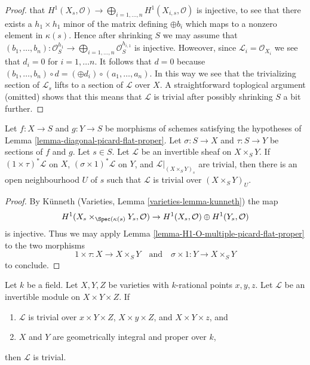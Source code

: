 \begin{proof}
that $H^1(X_s, \mathcal{O}) \to
\bigoplus_{i = 1, \ldots, n} H^1(X_{i, s}, \mathcal{O})$
is injective, to see that there exists a $h_1 \times h_1$ minor of the
matrix defining $\oplus b_i$ which maps to a nonzero
element in $\kappa(s)$. Hence after shrinking $S$ we may assume that
$(b_1, \ldots, b_n) : \mathcal{O}_S^{h_1}
\to \bigoplus_{i = 1, \ldots, n} \mathcal{O}_S^{h_{i, 1}}$
is injective. Howeover, since $\mathcal{L}_i = \mathcal{O}_{X_i}$
we see that $d_i = 0$ for $i = 1, \ldots n$. It follows that $d = 0$
because $(b_1, \ldots, b_n) \circ d = (\oplus d_i) \circ (a_1, \ldots, a_n)$.
In this way we see
that the trivializing section of $\mathcal{L}_s$ lifts to a section
of $\mathcal{L}$ over $X$. A straightforward toplogical argument (omitted)
shows that this means that $\mathcal{L}$ is trivial after possibly
shrinking $S$ a bit further.
\end{proof}

\begin{lemma}
\label{lemma-pic-of-product}
Let $f : X \to S$ and $g : Y \to S$ be morphisms of schemes
satisfying the hypotheses of Lemma \ref{lemma-diagonal-picard-flat-proper}.
Let $\sigma : S \to X$ and $\tau : S \to Y$ be sections of
$f$ and $g$. Let $s \in S$.
Let $\mathcal{L}$ be an invertible sheaf on $X \times_S Y$.
If $(1 \times \tau)^*\mathcal{L}$ on $X$, $(\sigma \times 1)^*\mathcal{L}$
on $Y$, and $\mathcal{L}|_{(X \times_S Y)_s}$ are trivial, then
there is an open neighbourhood $U$ of $s$ such that
$\mathcal{L}$ is trivial over $(X \times_S Y)_U$.
\end{lemma}

\begin{proof}
By K\"unneth (Varieties, Lemma \ref{varieties-lemma-kunneth})
the map
$$
H^1(X_s \times_{\Spec(\kappa(s)} Y_s, \mathcal{O}) \to
H^1(X_s, \mathcal{O}) \oplus H^1(Y_s, \mathcal{O})
$$
is injective. Thus we may
apply Lemma \ref{lemma-H1-O-multiple-picard-flat-proper}
to the two morphisms
$$
1 \times \tau : X \to X \times_S Y
\quad\text{and}\quad
\sigma \times 1 : Y \to X \times_S Y
$$
to conclude.
\end{proof}

\begin{theorem}
\label{theorem-of-the-cube}
Let $k$ be a field. Let $X, Y, Z$ be varieties with
$k$-rational points $x, y, z$. Let $\mathcal{L}$ be an invertible
module on $X \times Y \times Z$. If
\begin{enumerate}
\item $\mathcal{L}$ is trivial over
$x \times Y \times Z$, $X \times y \times Z$, and $X \times Y \times z$, and
\item $X$ and $Y$ are geometrically integral and proper over $k$,
\end{enumerate}
then $\mathcal{L}$ is trivial.
\end{theorem}

